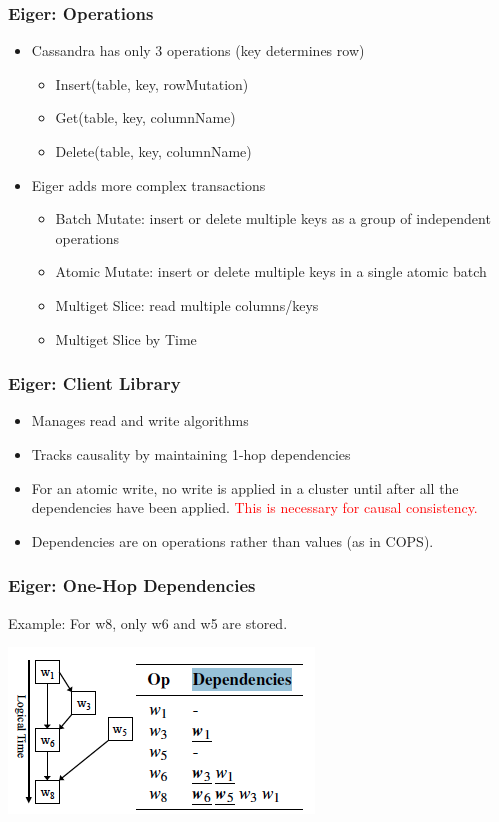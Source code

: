 \documentclass{beamer}
\begin{document}
\begin{frame}
\frametitle{Eiger: Operations}
\begin{itemize}
\item Cassandra has only 3 operations (key determines row)
	\begin{itemize}
		\item Insert(table, key, rowMutation)
		\item Get(table, key, columnName)
		\item Delete(table, key, columnName)
	\end{itemize}
\pause \item Eiger adds more complex transactions
	\begin{itemize}
		\item Batch Mutate: insert or delete multiple keys as a group of independent operations
		\item Atomic Mutate: insert or delete multiple keys in a single atomic batch
		\item Multiget Slice: read multiple columns/keys
		\item Multiget Slice by Time
	\end{itemize}	
\end{itemize}  
\end{frame}

\begin{frame}
\frametitle{Eiger: Client Library}
\begin{itemize}
\item Manages read and write algorithms
\item Tracks causality by maintaining 1-hop dependencies
\item For an atomic write, no write is applied in a cluster until after all the dependencies have been applied.  \textcolor{red}{This is necessary for causal consistency.}
\item Dependencies are on operations rather than values (as in COPS). 
\end{itemize}  
\end{frame}

\begin{frame}
\frametitle{Eiger: One-Hop Dependencies}

Example:  For w8, only w6 and w5 are stored.

\includegraphics[scale=0.5]{Figure_Dependencies.png}
\end{frame}
\end{document}
